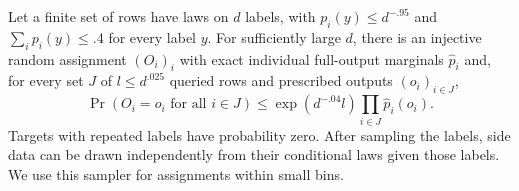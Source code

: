 \begin{lemma}\label{lem:near-product-injection}
Let a finite set of rows have laws on \(d\) labels, with
\(p_i(y)\le d^{-.95}\) and \(\sum_i p_i(y)\le .4\) for every label
\(y\). For sufficiently large \(d\), there is an injective random
assignment \((O_i)_i\) with exact individual full-output marginals
\(\widehat p_i\) and, for every set \(J\) of \(l\le d^{.025}\) queried
rows and prescribed outputs \((o_i)_{i\in J}\),
\begin{equation}
 \Pr(O_i=o_i\text{ for all }i\in J)
 \le \exp(d^{-.04}l)\prod_{i\in J}\widehat p_i(o_i).
 \label{eq:source-17}
\end{equation}
Targets with repeated labels have probability zero. After sampling the
labels, side data can be drawn independently from their conditional laws
given those labels. We use this sampler for assignments within small bins.
\end{lemma}

